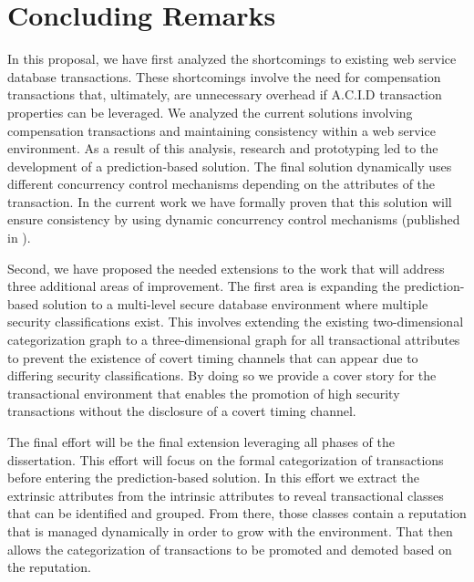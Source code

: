 \section{Concluding Remarks}
\label{conclusion:concluding_remarks}
In this proposal, we have first analyzed the shortcomings to existing web service database transactions. These shortcomings involve the need for compensation transactions that, ultimately, are unnecessary overhead if A.C.I.D transaction properties can be leveraged. We analyzed the current solutions involving compensation transactions and maintaining consistency within a web service environment. As a result of this analysis, research and prototyping led to the development of a prediction-based solution. The final solution dynamically uses different concurrency control mechanisms depending on the attributes of the transaction. In the current work we have formally proven that this solution will ensure consistency by using dynamic concurrency control mechanisms (published in \cite{ravan_ensuring_2020}).

Second, we have proposed the needed extensions to the work that will address three additional areas of improvement. The first area is expanding the prediction-based solution to a multi-level secure database environment where multiple security classifications exist. This involves extending the existing two-dimensional categorization graph to a three-dimensional graph for all transactional attributes to prevent the existence of covert timing channels that can appear due to differing security classifications. By doing so we provide a cover story for the transactional environment that enables the promotion of high security transactions without the disclosure of a covert timing channel.

The final effort will be the final extension leveraging all phases of the dissertation. This effort will focus on the formal categorization of transactions before entering the prediction-based solution. In this effort we extract the extrinsic attributes from the intrinsic attributes to reveal transactional classes that can be identified and grouped. From there, those classes contain a reputation that is managed dynamically in order to grow with the environment. That then allows the categorization of transactions to be promoted and demoted based on the reputation.

